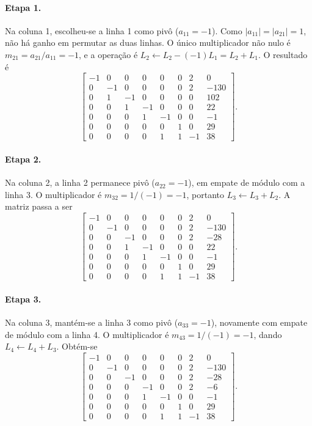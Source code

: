 \documentclass[11pt,a4paper]{article}
\begin{document}
\paragraph{Etapa 1.} Na coluna 1, escolheu-se a linha 1 como pivô ($a_{11}=-1$). Como $|a_{11}|=|a_{21}|=1$, não há ganho em permutar as duas linhas. O único multiplicador não nulo é $m_{21}=a_{21}/a_{11}=-1$, e a operação é $L_2\leftarrow L_2-(-1)L_1=L_2+L_1$. O resultado é
\[
\left[\begin{array}{rrrrrrr|r}
-1&0&0&0&0&0&2&0\\0&-1&0&0&0&0&2&-130\\0&1&-1&0&0&0&0&102\\0&0&1&-1&0&0&0&22\\0&0&0&1&-1&0&0&-1\\0&0&0&0&0&1&0&29\\0&0&0&0&1&1&-1&38
\end{array}\right].
\]

\paragraph{Etapa 2.} Na coluna 2, a linha 2 permanece pivô ($a_{22}=-1$), em empate de módulo com a linha 3. O multiplicador é $m_{32}=1/(-1)=-1$, portanto $L_3\leftarrow L_3+L_2$. A matriz passa a ser
\[
\left[\begin{array}{rrrrrrr|r}
-1&0&0&0&0&0&2&0\\0&-1&0&0&0&0&2&-130\\0&0&-1&0&0&0&2&-28\\0&0&1&-1&0&0&0&22\\0&0&0&1&-1&0&0&-1\\0&0&0&0&0&1&0&29\\0&0&0&0&1&1&-1&38
\end{array}\right].
\]

\paragraph{Etapa 3.} Na coluna 3, mantém-se a linha 3 como pivô ($a_{33}=-1$), novamente com empate de módulo com a linha 4. O multiplicador é $m_{43}=1/(-1)=-1$, dando $L_4\leftarrow L_4+L_3$. Obtém-se
\[
\left[\begin{array}{rrrrrrr|r}
-1&0&0&0&0&0&2&0\\0&-1&0&0&0&0&2&-130\\0&0&-1&0&0&0&2&-28\\0&0&0&-1&0&0&2&-6\\0&0&0&1&-1&0&0&-1\\0&0&0&0&0&1&0&29\\0&0&0&0&1&1&-1&38
\end{array}\right].
\]
\end{document}
